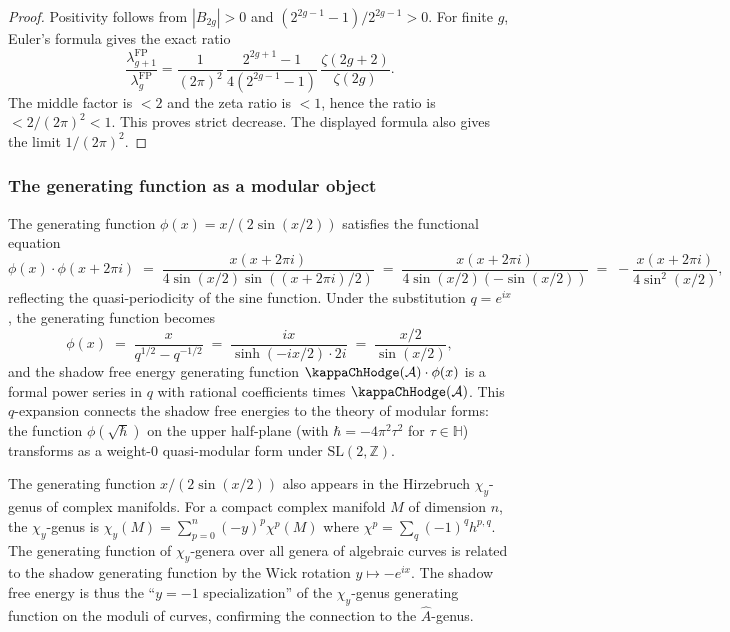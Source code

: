 \begin{proof}
Positivity follows from $|B_{2g}| > 0$ and $(2^{2g-1}-1)/2^{2g-1} > 0$. For finite $g$, Euler's formula gives the exact ratio
\[
\frac{\lambda_{g+1}^{\mathrm{FP}}}{\lambda_g^{\mathrm{FP}}}
= \frac{1}{(2\pi)^2}\,
\frac{2^{2g+1}-1}{4(2^{2g-1}-1)}\,
\frac{\zeta(2g+2)}{\zeta(2g)} .
\]
The middle factor is \(<2\) and the zeta ratio is \(<1\), hence the
ratio is \(<2/(2\pi)^2<1\). This proves strict decrease. The displayed
formula also gives the limit \(1/(2\pi)^2\).
\end{proof}

\subsubsection{The generating function as a modular object}

\begin{remark}
The generating function $\phi(x) = x/(2\sin(x/2))$ satisfies the functional equation
\begin{equation}%
\phi(x) \cdot \phi(x + 2\pi i) \;=\; \frac{x(x + 2\pi i)}{4\sin(x/2)\sin((x+2\pi i)/2)} \;=\; \frac{x(x + 2\pi i)}{4\sin(x/2)(-\sin(x/2))} \;=\; -\frac{x(x+2\pi i)}{4\sin^2(x/2)},
\end{equation}
reflecting the quasi-periodicity of the sine function. Under the substitution $q = e^{ix}$, the generating function becomes
\begin{equation}%
\phi(x) \;=\; \frac{x}{q^{1/2} - q^{-1/2}} \;=\; \frac{ix}{\sinh(-ix/2) \cdot 2i} \;=\; \frac{x/2}{\sin(x/2)},
\end{equation}
and the shadow free energy generating function
$\kappaChHodge(\cA)\cdot\phi(x)$ is a formal power series in $q$ with
rational coefficients times $\kappaChHodge(\cA)$. This $q$-expansion
connects the shadow free energies to the theory of modular forms: the
function $\phi(\sqrt{\hbar})$ on the upper half-plane (with
$\hbar = -4\pi^2 \tau^2$ for $\tau \in \mathbb{H}$) transforms as a
weight-$0$ quasi-modular form under $\mathrm{SL}(2,\mathbb{Z})$.
\end{remark}

\begin{remark}
The generating function $x/(2\sin(x/2))$ also appears in the Hirzebruch $\chi_y$-genus of complex manifolds. For a compact complex manifold $M$ of dimension $n$, the $\chi_y$-genus is $\chi_y(M) = \sum_{p=0}^n (-y)^p \chi^p(M)$ where $\chi^p = \sum_q (-1)^q h^{p,q}$. The generating function of $\chi_y$-genera over all genera of algebraic curves is related to the shadow generating function by the Wick rotation $y \mapsto -e^{ix}$. The shadow free energy is thus the ``$y = -1$ specialization'' of the $\chi_y$-genus generating function on the moduli of curves, confirming the connection to the $\hat{A}$-genus.
\end{remark}

